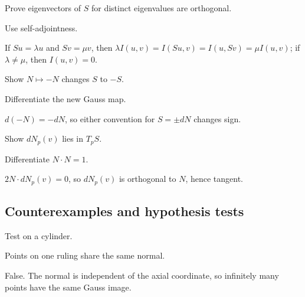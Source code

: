 \begin{exercise}\label{exr:vii16-ped-07}
Prove eigenvectors of \(S\) for distinct eigenvalues are orthogonal.
\end{exercise}
\begin{hint}
Use self-adjointness.
\end{hint}
\begin{solution}
If \(Su=\lambda u\) and \(Sv=\mu v\), then \(\lambda I(u,v)=I(Su,v)=I(u,Sv)=\mu I(u,v)\); if \(\lambda\neq\mu\), then \(I(u,v)=0\).
\end{solution}

\begin{exercise}\label{exr:vii16-ped-08}
Show \(N\mapsto-N\) changes \(S\) to \(-S\).
\end{exercise}
\begin{hint}
Differentiate the new Gauss map.
\end{hint}
\begin{solution}
\(d(-N)=-dN\), so either convention for \(S=\pm dN\) changes sign.
\end{solution}

\begin{exercise}\label{exr:vii16-ped-09}
Show \(dN_p(v)\) lies in \(T_pS\).
\end{exercise}
\begin{hint}
Differentiate \(N\cdot N=1\).
\end{hint}
\begin{solution}
\(2N\cdot dN_p(v)=0\), so \(dN_p(v)\) is orthogonal to \(N\), hence tangent.
\end{solution}

\subsection*{Counterexamples and hypothesis tests}

\begin{exercise}\label{exr:vii16-ped-10}
Test on a cylinder.
\end{exercise}
\begin{hint}
Points on one ruling share the same normal.
\end{hint}
\begin{solution}
False.  The normal is independent of the axial coordinate, so infinitely many points have the same Gauss image.
\end{solution}


